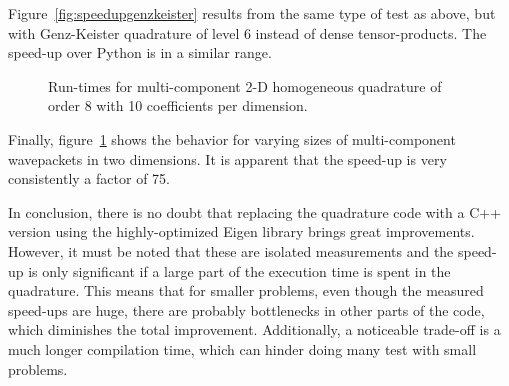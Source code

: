 Figure~\ref{fig:speedupgenzkeister} results from the same type of test as above,
but with Genz-Keister quadrature of level 6 instead of dense tensor-products.
The speed-up over Python is in a similar range.

\begin{figure}
  \center
  
  \caption{Run-times for multi-component 2-D homogeneous quadrature of order 8
    with 10 coefficients per dimension.}
  \label{fig:speedupncomps}
\end{figure}

Finally, figure~\ref{fig:speedupncomps} shows the behavior for varying sizes
of multi-component wavepackets in two dimensions.
It is apparent that the speed-up is very consistently a factor of 75.

In conclusion, there is no doubt that replacing the quadrature code with a C++
version using the highly-optimized Eigen library brings great improvements.
However, it must be noted that these are isolated measurements and the speed-up
is only significant if a large part of the execution time is spent in the
quadrature.
This means that for smaller problems, even though the measured speed-ups are
huge, there are probably bottlenecks in other parts of the code, which
diminishes the total improvement.
Additionally, a noticeable trade-off is a much longer compilation time, which
can hinder doing many test with small problems.
